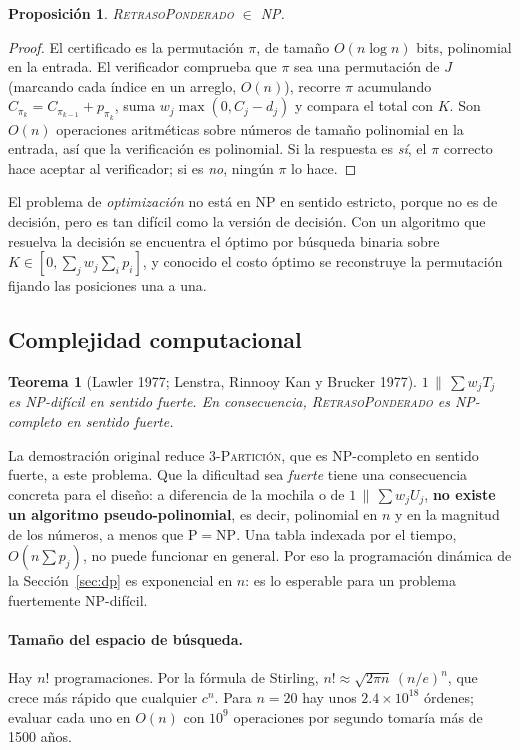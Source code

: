 \documentclass[10pt,twocolumn,letterpaper]{article}
\newtheorem{teorema}{Teorema}
\newtheorem{proposicion}{Proposición}
\begin{document}
\begin{proposicion}
\textsc{RetrasoPonderado} $\in$ NP.
\end{proposicion}

\begin{proof}
El certificado es la permutación $\pi$, de tamaño $O(n\log n)$ bits, polinomial
en la entrada. El verificador comprueba que $\pi$ sea una permutación de $J$
(marcando cada índice en un arreglo, $O(n)$), recorre $\pi$ acumulando
$C_{\pi_k}=C_{\pi_{k-1}}+p_{\pi_k}$, suma $w_j\max(0,C_j-d_j)$ y compara el
total con $K$. Son $O(n)$ operaciones aritméticas sobre números de tamaño
polinomial en la entrada, así que la verificación es polinomial. Si la
respuesta es \emph{sí}, el $\pi$ correcto hace aceptar al verificador; si es
\emph{no}, ningún $\pi$ lo hace.
\end{proof}

El problema de \emph{optimización} no está en NP en sentido estricto, porque no
es de decisión, pero es tan difícil como la versión de decisión. Con un
algoritmo que resuelva la decisión se encuentra el óptimo por búsqueda binaria
sobre $K\in[0,\sum_j w_j\sum_i p_i]$, y conocido el costo óptimo se reconstruye
la permutación fijando las posiciones una a una.

\subsection{Complejidad computacional}

\begin{teorema}[Lawler 1977; Lenstra, Rinnooy Kan y Brucker 1977]
$1\,\|\,\sum w_jT_j$ es NP-difícil en sentido fuerte. En consecuencia,
\textsc{RetrasoPonderado} es NP-completo en sentido fuerte.
\end{teorema}

La demostración original reduce \textsc{3-Partición}, que es NP-completo en
sentido fuerte, a este problema. Que la dificultad sea \emph{fuerte} tiene una
consecuencia concreta para el diseño: a diferencia de la mochila o de
$1\,\|\,\sum w_jU_j$, \textbf{no existe un algoritmo pseudo-polinomial}, es
decir, polinomial en $n$ y en la magnitud de los números, a menos que
$\mathrm{P}=\mathrm{NP}$. Una tabla indexada por el tiempo, $O(n\sum p_j)$, no
puede funcionar en general. Por eso la programación dinámica de la
Sección~\ref{sec:dp} es exponencial en $n$: es lo esperable para un problema
fuertemente NP-difícil.

\paragraph{Tamaño del espacio de búsqueda.} Hay $n!$ programaciones. Por la
fórmula de Stirling, $n!\approx\sqrt{2\pi n}\,(n/e)^n$, que crece más rápido
que cualquier $c^n$. Para $n=20$ hay unos $2.4\times10^{18}$ órdenes; evaluar
cada uno en $O(n)$ con $10^9$ operaciones por segundo tomaría más de 1500
años.
\end{document}

